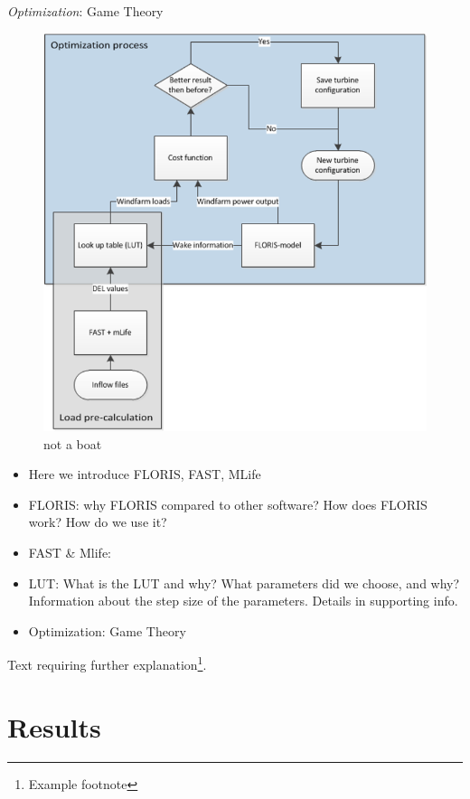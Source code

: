 \documentclass[twoside,twocolumn]{article}
\begin{document}
\textit{Optimization}: Game Theory
\begin{figure}
  \includegraphics[width=\linewidth]{OptimizationProcess.png}
  \caption{not a boat}
  \label{fig:optim}
\end{figure}

	\begin{itemize}
		\item Here we introduce FLORIS, FAST, MLife
		\item FLORIS: why FLORIS compared to other software? How does FLORIS work? How do we use it?
		\item FAST \& Mlife:
		\item LUT: What is the LUT and why? What parameters did we choose, and why? Information about the step size of the parameters. Details in supporting info.
		\item Optimization: Game Theory
	\end{itemize}
	\blindtext %
	





	Text requiring further explanation\footnote{Example footnote}.
	
	
	\section{Results}
	
\end{document}

